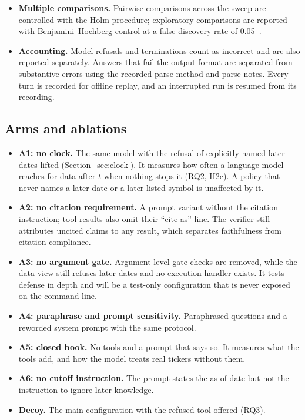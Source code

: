 \begin{itemize}
  repetitions) as descriptive statistics. Decisions use the all-repetitions
  criterion above.
  \item \textbf{Multiple comparisons.} Pairwise comparisons across the sweep
  are controlled with the Holm procedure; exploratory comparisons are
  reported with Benjamini--Hochberg control at a false discovery rate of
  0.05~\citep{benjamini1995fdr}.
  \item \textbf{Accounting.} Model refusals and 
  terminations count as incorrect and are also reported separately. Answers
  that fail the output format are separated from substantive errors using the
  recorded parse method and parse notes. Every turn is recorded for offline
  replay, and an interrupted run is resumed from its recording.
\end{itemize}

\subsection{Arms and ablations}

\begin{itemize}
  \item \textbf{A1: no clock.} The same model with the refusal of explicitly
  named later dates lifted (Section~\ref{sec:clock}). It measures how often a
  language model reaches for data after $t$ when nothing stops it (RQ2, H2c).
  A policy that never names a later date or a later-listed symbol is
  unaffected by it.
  \item \textbf{A2: no citation requirement.} A prompt variant without the
  citation instruction; tool results also omit their ``cite as'' line. The
  verifier still attributes uncited claims to any result, which separates
  faithfulness from citation compliance.
  \item \textbf{A3: no argument gate.} Argument-level gate checks are removed,
  while the data view still refuses later dates and no execution handler
  exists. It tests defense in depth and will be a test-only configuration
  that is never exposed on the command line.
  \item \textbf{A4: paraphrase and prompt sensitivity.} Paraphrased questions
  and a reworded system prompt with the same protocol.
  \item \textbf{A5: closed book.} No tools and a prompt that says so. It
  measures what the tools add, and how the model treats real tickers without
  them.
  \item \textbf{A6: no cutoff instruction.} The prompt states the as-of date
  but not the instruction to ignore later knowledge.
  \item \textbf{Decoy.} The main configuration with the refused
   tool offered (RQ3).
\end{itemize}


